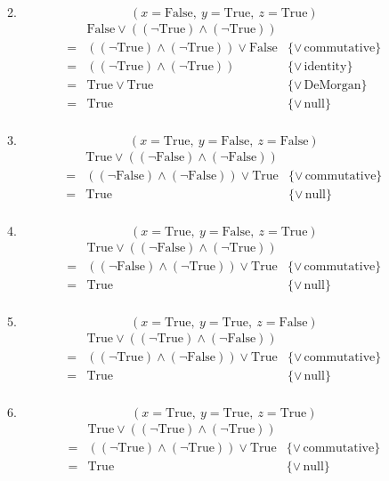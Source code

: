 \documentclass[fleqn]{article}
\newenvironment{proof}
  {\[\begin{array}{lll}}
  {\end{array}\]}
\newcommand{\law}[2][\!]{\{{#1\,}\mbox{{#2}}\}}
\newcommand{\True}[0]{\mathrm{True}}
\newcommand{\False}[0]{\mathrm{False}}
\begin{document}
\begin{enumerate}
\begin{enumerate}
\begin{proof}
          \end{proof}
        \item
          \[ (x = \False,\ y = \True,\ z = \True) \]
          \begin{proof}
              & \False \vee ((\neg \True) \wedge (\neg \True)) & \\
            = & ((\neg \True) \wedge (\neg \True)) \vee \False & \law[\vee]{commutative} \\
            = & ((\neg \True) \wedge (\neg \True)) & \law[\vee]{identity} \\
            = & \True \vee \True & \law[\vee]{DeMorgan} \\
            = & \True & \law[\vee]{null} \\
          \end{proof}
        \item
          \[ (x = \True,\ y = \False,\ z = \False) \]
          \begin{proof}
              & \True \vee ((\neg \False) \wedge (\neg \False)) & \\
            = & ((\neg \False) \wedge (\neg \False)) \vee \True & \law[\vee]{commutative} \\
            = & \True & \law[\vee]{null} \\
          \end{proof}
        \item
          \[ (x = \True,\ y = \False,\ z = \True) \]
          \begin{proof}
              & \True \vee ((\neg \False) \wedge (\neg \True)) & \\
            = & ((\neg \False) \wedge (\neg \True)) \vee \True & \law[\vee]{commutative} \\
            = & \True & \law[\vee]{null} \\
          \end{proof}
        \item
          \[ (x = \True,\ y = \True,\ z = \False) \]
          \begin{proof}
              & \True \vee ((\neg \True) \wedge (\neg \False)) & \\
            = & ((\neg \True) \wedge (\neg \False)) \vee \True & \law[\vee]{commutative} \\
            = & \True & \law[\vee]{null} \\
          \end{proof}
        \item
          \[ (x = \True,\ y = \True,\ z = \True) \]
          \begin{proof}
              & \True \vee ((\neg \True) \wedge (\neg \True)) & \\
            = & ((\neg \True) \wedge (\neg \True)) \vee \True & \law[\vee]{commutative} \\
            = & \True & \law[\vee]{null} \\
          \end{proof}
      \end{enumerate}
  \end{enumerate}
\end{document}
